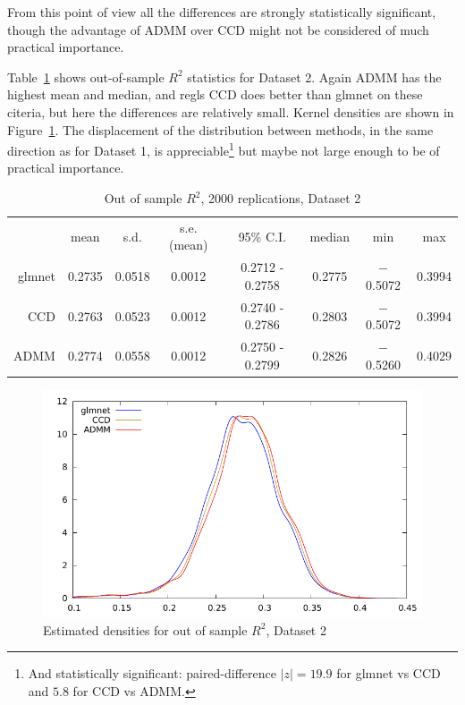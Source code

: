 \documentclass{article}
\begin{document}
From this point of view all the differences are strongly statistically
significant, though the advantage of ADMM over CCD might not be
considered of much practical importance.


Table~\ref{tab:dset2} shows out-of-sample $R^2$ statistics for Dataset
2. Again ADMM has the highest mean and median, and regls CCD does
better than glmnet on these citeria, but here the differences are
relatively small. Kernel densities are shown in
Figure~\ref{fig:dset2}. The displacement of the distribution between
methods, in the same direction as for Dataset 1, is
appreciable\footnote{And statistically significant: paired-difference
  $|z| = 19.9$ for glmnet vs CCD and $5.8$ for CCD vs ADMM.} but
maybe not large enough to be of practical importance.

\begin{table}[htbp]
  \centering
  \begin{tabular}{rccccccc}
 & mean & s.d. & s.e.(mean) & 95\% C.I. & median & min & max \\
      glmnet & 0.2735 & 0.0518 & 0.0012 & 0.2712 - 0.2758 & 0.2775 & $-$0.5072 & 0.3994 \\
         CCD & 0.2763 & 0.0523 & 0.0012 & 0.2740 - 0.2786 & 0.2803 & $-$0.5072 & 0.3994 \\
        ADMM & 0.2774 & 0.0558 & 0.0012 & 0.2750 - 0.2799 & 0.2826 & $-$0.5260 & 0.4029 \\
  \end{tabular}
  \caption{Out of sample $R^2$, 2000 replications, Dataset 2}
  \label{tab:dset2}
\end{table}

\begin{figure}[htbp]
  \centering
  \includegraphics[scale=0.9]{wine_kd3.pdf} 
  \caption{Estimated densities for out of sample $R^2$, Dataset 2}
  \label{fig:dset2}
\end{figure}
\end{document}
